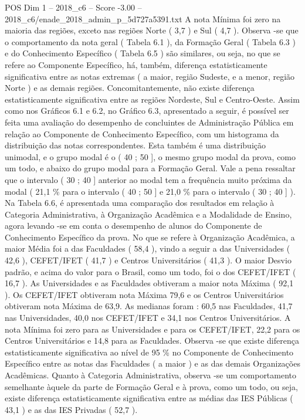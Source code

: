 \begin{textsample}{POS Dim 1 – 2018\_c6 – Score -3.00 – 2018\_c6/enade\_2018\_admin\_p\_5d727a5391.txt}
A nota Mínima foi zero na maioria das regiões, exceto nas regiões Norte ( 3,7 ) e Sul ( 4,7 ).
Observa -se que o comportamento da nota geral ( Tabela 6.1 ), da Formação Geral ( Tabela 6.3 ) e do Conhecimento Específico ( Tabela 6.5 ) são similares, ou seja, no que se refere ao Componente Específico, há, também, diferença estatisticamente significativa entre as notas extremas ( a maior, região Sudeste, e a menor, região Norte ) e as demais regiões.
Concomitantemente, não existe diferença estatisticamente significativa entre as regiões Nordeste, Sul e Centro-Oeste.
Assim como nos Gráficos 6.1 e 6.2, no Gráfico 6.3, apresentado a seguir, é possível ser feita uma avaliação do desempenho de concluintes de Administração Pública em relação ao Componente de Conhecimento Específico, com um histograma da distribuição das notas correspondentes.
Esta também é uma distribuição unimodal, e o grupo modal é o ( 40 ; 50 ], o mesmo grupo modal da prova, como um todo, e abaixo do grupo modal para a Formação Geral.
Vale a pena ressaltar que o intervalo ( 30 ; 40 ] anterior ao modal tem a frequência muito próxima da modal ( 21,1 \% para o intervalo ( 40 ; 50 ] e 21,0 \% para o intervalo ( 30 ; 40 ] ).
Na Tabela 6.6, é apresentada uma comparação dos resultados em relação à Categoria Administrativa, à Organização Acadêmica e a Modalidade de Ensino, agora levando -se em conta o desempenho de alunos do Componente de Conhecimento Específico da prova.
No que se refere à Organização Acadêmica, a maior Média foi a das Faculdades ( 58,4 ), vindo a seguir a das Universidades ( 42,6 ), CEFET/IFET ( 41,7 ) e Centros Universitários ( 41,3 ).
O maior Desvio padrão, e acima do valor para o Brasil, como um todo, foi o dos CEFET/IFET ( 16,7 ).
As Universidades e as Faculdades obtiveram a maior nota Máxima ( 92,1 ).
Os CEFET/IFET obtiveram nota Máxima 79,6 e os Centros Universitários obtiveram nota Máxima de 63,9.
As medianas foram : 60,5 nas Faculdades, 41,7 nas Universidades, 40,0 nos CEFET/IFET e 34,1 nos Centros Universitários.
A nota Mínima foi zero para as Universidades e para os CEFET/IFET, 22,2 para os Centros Universitários e 14,8 para as Faculdades.
Observa -se que existe diferença estatisticamente significativa ao nível de 95 \% no Componente de Conhecimento Específico entre as notas das Faculdades ( a maior ) e as das demais Organizações Acadêmicas.
Quanto à Categoria Administrativa, observa -se um comportamento semelhante àquele da parte de Formação Geral e à prova, como um todo, ou seja, existe diferença estatisticamente significativa entre as médias das IES Públicas ( 43,1 ) e as das IES Privadas ( 52,7 ).

\end{textsample}
